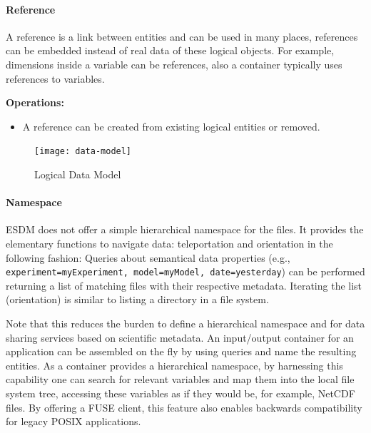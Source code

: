 \paragraph{Reference}
A reference is a link between entities and can be used in many places, references can be embedded instead of real data of these logical objects.
For example, dimensions inside a variable can be references, also a container typically uses references to variables.

\textbf{Operations:}
\begin{itemize}
	\item A reference can be created from existing logical entities or removed.
\end{itemize}






\begin{figure}
	\centering
	\texttt{[image: data-model]}
	\caption{Logical Data Model}
	\label{fig:data-model}
\end{figure}

\paragraph{Namespace}

ESDM does not offer a simple hierarchical namespace for the files.
It provides the elementary functions to navigate data: teleportation and orientation in the following fashion:
Queries about semantical data properties (e.g., \texttt{experiment=myExperiment, model=myModel, date=yesterday}) can be performed returning a list of matching files with their respective metadata.
Iterating the list (orientation) is similar to listing a directory in a file system.

Note that this reduces the burden to define a hierarchical namespace and for data sharing services based on scientific metadata.
An input/output container for an application can be assembled on the fly by using queries and name the resulting entities.
As a container provides a hierarchical namespace,
by harnessing this capability one can search for relevant variables and map them into the local file system tree, accessing these variables as if they would be, for example, NetCDF files.
By offering a FUSE client, this feature also enables backwards compatibility for legacy POSIX applications.




